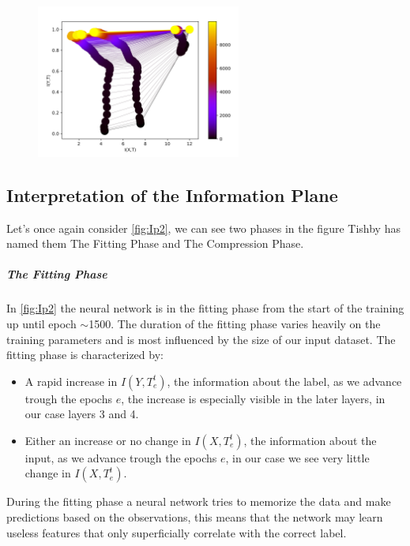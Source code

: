 \begin{figure}[H]
  \centering
  \includegraphics[width=0.60\textwidth]{figs/ip_10000.png}
  \label{fig:Ip2}
\end{figure}

\subsection{Interpretation of the Information Plane}

Let's once again consider \autoref{fig:Ip2}, we can see two phases in the figure
Tishby has named them The Fitting Phase and The Compression Phase.

\subparagraph{The Fitting Phase} In \autoref{fig:Ip2} the neural network is in
the fitting phase from the start of the training up until epoch $\sim$1500. The
duration of the fitting phase varies heavily on the training parameters and is
most influenced by the size of our input dataset. The fitting phase is
characterized by:
\begin{itemize}
  \item{
      A rapid increase in $I(Y, T_e^t)$, the information about the label, as we
      advance trough the epochs $e$, the increase is especially visible in the
      later layers, in our case layers 3 and 4.
    }
  \item{
      Either an increase or no change in $I(X, T_e^t)$, the information about
      the input, as we advance trough the epochs $e$, in our case we see very
      little change in $I(X,T_e^t)$.
    }
\end{itemize}

During the fitting phase a neural network tries to memorize the data and make
predictions based on the observations, this means that the network may learn
useless features that only superficially correlate with the correct label.

